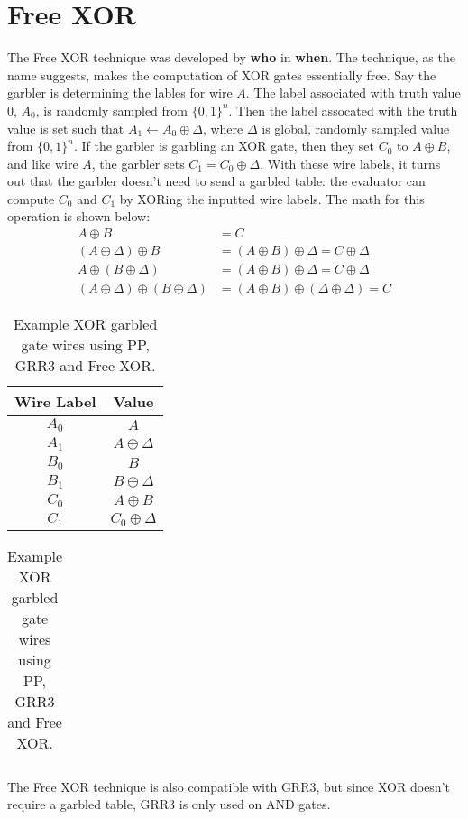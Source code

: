 \section{Free XOR}
The Free XOR technique was developed by \textbf{who} in \textbf{when}.
The technique, as the name suggests, makes the computation of XOR gates essentially free.
Say the garbler is determining the lables for wire $A$.
The label associated with truth value $0$, $A_0$, is randomly sampled from $\{0,1\}^n$. 
Then the label assocated with the truth value is set such that $A_1 \gets A_0 \oplus \Delta$, where $\Delta$ is global, randomly sampled value from $\{0,1\}^n$.
If the garbler is garbling an XOR gate, then they set $C_0$ to $A \oplus B$, and like wire $A$, the garbler sets $C_1 = C_0 \oplus \Delta$.
With these wire labels, it turns out that the garbler doesn't need to send a garbled table: the evaluator can compute $C_0$ and $C_1$ by XORing the inputted wire labels.
The math for this operation is shown below:
\begin{align*}
    A \oplus B & = C \\
    (A \oplus \Delta) \oplus B & = (A \oplus B) \oplus \Delta = C \oplus \Delta \\
    A \oplus (B \oplus \Delta) & = (A \oplus B) \oplus \Delta = C \oplus \Delta \\
    (A \oplus \Delta) \oplus (B \oplus \Delta) & = (A \oplus B) \oplus (\Delta \oplus  \Delta) = C 
\end{align*}

\begin{table}[h]
    \centering
    \begin{tabular}{|c|c|}
    \hline
    Wire Label & Value\\
    \hline
    $A_0$ & $A$ \\
    $A_1$ & $A \oplus \Delta$ \\
    $B_0$ & $B$ \\
    $B_1$ & $B \oplus \Delta$ \\
    $C_0$ & $A \oplus B$ \\
    $C_1$ & $C_0 \oplus \Delta$ \\
    \hline
    \end{tabular}
    \qquad
    \begin{tabular}{|c|}
    \hline
    \hline
    \end{tabular}
    \caption{Example XOR garbled gate wires using PP, GRR3 and Free XOR.}
\end{table}

The Free XOR technique is also compatible with GRR3, but since XOR doesn't require a garbled table, GRR3 is only used on AND gates.

